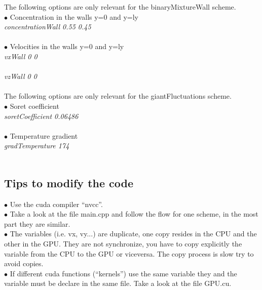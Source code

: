 \documentclass[aps,prl]{revtex4}
\begin{document}
The following options are only relevant for the binaryMixtureWall scheme. \\
$\bullet$ Concentration in the walls y=0 and y=ly \\
\emph{concentrationWall           0.55     0.45} \\ \\
$\bullet$ Velocities in the walls y=0 and y=ly \\
\emph{vxWall			0 	0}\\\\
\emph{vzWall			0	0}\\\\

The following options are only relevant for the giantFluctuations scheme. \\
$\bullet$ Soret coefficient \\
\emph{soretCoefficient        0.06486} \\ \\
$\bullet$ Temperature gradient \\
\emph{gradTemperature         174}\\\\


\subsection{Tips to modify the code}
$\bullet$ Use the cuda compiler ``nvcc''. \\

$\bullet$ Take a look at the file main.cpp and follow the flow for one scheme, in the
most part they are similar. \\

$\bullet$ The variables (i.e. vx, vy...) are duplicate, one copy resides in the CPU and the
other in the GPU. They are not synchronize, you have to copy explicitly the variable
from the CPU to the GPU or viceversa. The copy process is slow try to avoid copies. \\

$\bullet$ If different cuda functions (``kernels'') use the same variable they and the variable 
must be declare in the same file. Take a look at the file GPU.cu.
\end{document}
